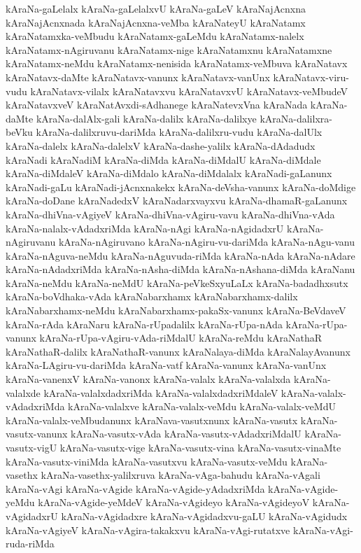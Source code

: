 {kAraNa-gaLelalx
kAraNa-gaLelalxvU
kAraNa-gaLeV
kAraNajAcnxna
kAraNajAcnxnada
kAraNajAcnxna-veMba
kAraNateyU
kAraNatamx
kAraNatamxka-veMbudu
kAraNatamx-gaLeMdu
kAraNatamx-nalelx
kAraNatamx-nAgiruvanu
kAraNatamx-nige
kAraNatamxnu
kAraNatamxne
kAraNatamx-neMdu
kAraNatamx-nenisida
kAraNatamx-veMbuva
kAraNatavx
kAraNatavx-daMte
kAraNatavx-vanunx
kAraNatavx-vanUnx
kAraNatavx-viru-vudu
kAraNatavx-vilalx
kAraNatavxvu
kAraNatavxvU
kAraNatavx-veMbudeV
kAraNatavxveV
kAraNatAvxdi-sAdhanege
kAraNatevxVna
kAraNada
kAraNa-daMte
kAraNa-dalAlx-gali
kAraNa-dalilx
kAraNa-dalilxye
kAraNa-dalilxra-beVku
kAraNa-dalilxruvu-dariMda
kAraNa-dalilxru-vudu
kAraNa-dalUlx
kAraNa-dalelx
kAraNa-dalelxV
kAraNa-dashe-yalilx
kAraNa-dAdadudx
kAraNadi
kAraNadiM
kAraNa-diMda
kAraNa-diMdalU
kAraNa-diMdale
kAraNa-diMdaleV
kAraNa-diMdalo
kAraNa-diMdalalx
kAraNadi-gaLanunx
kAraNadi-gaLu
kAraNadi-jAcnxnakekx
kAraNa-deVsha-vanunx
kAraNa-doMdige
kAraNa-doDane
kAraNadedxV
kAraNadarxvayxvu
kAraNa-dhamaR-gaLanunx
kAraNa-dhiVna-vAgiyeV
kAraNa-dhiVna-vAgiru-vavu
kAraNa-dhiVna-vAda
kAraNa-nalalx-vAdadxriMda
kAraNa-nAgi
kAraNa-nAgidadxrU
kAraNa-nAgiruvanu
kAraNa-nAgiruvano
kAraNa-nAgiru-vu-dariMda
kAraNa-nAgu-vanu
kAraNa-nAguva-neMdu
kAraNa-nAguvuda-riMda
kAraNa-nAda
kAraNa-nAdare
kAraNa-nAdadxriMda
kAraNa-nAsha-diMda
kAraNa-nAshana-diMda
kAraNanu
kAraNa-neMdu
kAraNa-neMdU
kAraNa-peVkeSxyuLaLx
kAraNa-badadhxsutx
kAraNa-boVdhaka-vAda
kAraNabarxhamx
kAraNabarxhamx-dalilx
kAraNabarxhamx-neMdu
kAraNabarxhamx-pakaSx-vanunx
kAraNa-BeVdaveV
kAraNa-rAda
kAraNaru
kAraNa-rUpadalilx
kAraNa-rUpa-nAda
kAraNa-rUpa-vanunx
kAraNa-rUpa-vAgiru-vAda-riMdalU
kAraNa-reMdu
kAraNathaR
kAraNathaR-dalilx
kAraNathaR-vanunx
kAraNalaya-diMda
kAraNalayAvanunx
kAraNa-LAgiru-vu-dariMda
kAraNa-vatf
kAraNa-vanunx
kAraNa-vanUnx
kAraNa-vanenxV
kAraNa-vanonx
kAraNa-valalx
kAraNa-valalxda
kAraNa-valalxde
kAraNa-valalxdadxriMda
kAraNa-valalxdadxriMdaleV
kAraNa-valalx-vAdadxriMda
kAraNa-valalxve
kAraNa-valalx-veMdu
kAraNa-valalx-veMdU
kAraNa-valalx-veMbudanunx
kAraNava-vasutxnunx
kAraNa-vasutx
kAraNa-vasutx-vanunx
kAraNa-vasutx-vAda
kAraNa-vasutx-vAdadxriMdalU
kAraNa-vasutx-vigU
kAraNa-vasutx-vige
kAraNa-vasutx-vina
kAraNa-vasutx-vinaMte
kAraNa-vasutx-viniMda
kAraNa-vasutxvu
kAraNa-vasutx-veMdu
kAraNa-vasethx
kAraNa-vasethx-yalilxruva
kAraNa-vAga-bahudu
kAraNa-vAgali
kAraNa-vAgi
kAraNa-vAgide
kAraNa-vAgide-yAdadxriMda
kAraNa-vAgide-yeMdu
kAraNa-vAgide-yeMdeV
kAraNa-vAgideyo
kAraNa-vAgideyoV
kAraNa-vAgidadxrU
kAraNa-vAgidadxre
kAraNa-vAgidadxvu-gaLU
kAraNa-vAgidudx
kAraNa-vAgiyeV
kAraNa-vAgira-takakxvu
kAraNa-vAgi-rutatxve
kAraNa-vAgi-ruda-riMda
}
